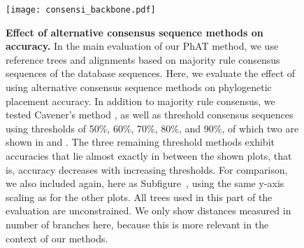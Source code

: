 \begin{figure}[hpbt]
    \centering
    \texttt{[image: consensi\_backbone.pdf]}
    \begin{subfigure}{0pt}
        \label{fig:consensi_backbone:sub:majorities}
    \end{subfigure}
    \begin{subfigure}{0pt}
        \label{fig:consensi_backbone:sub:cavener}
    \end{subfigure}
    \begin{subfigure}{0pt}
        \label{fig:consensi_backbone:sub:50_threshold}
    \end{subfigure}
    \begin{subfigure}{0pt}
        \label{fig:consensi_backbone:sub:90_threshold}
    \end{subfigure}
    \caption[Effect of alternative consensus sequence methods on accuracy]{
        \textbf{Effect of alternative consensus sequence methods on accuracy.}
        In the main evaluation of our \ac{PhAT} method,
        we use reference trees and alignments based on majority rule consensus sequences \cite{May1952,Day1992a}
        of the  database sequences.
        Here, we evaluate the effect of using alternative consensus sequence methods
        on phylogenetic placement accuracy.
        In addition to  majority rule consensus, we tested
         Cavener's method \cite{Cavener1987,Cavener1991a},
        as well as threshold consensus sequences \cite{Day1992a,Day1992}
        using thresholds of 50\%, 60\%, 70\%, 80\%, and 90\%, of which two are shown in
         and .
        The three remaining threshold methods exhibit accuracies that lie almost exactly in between the shown plots,
        that is, accuracy decreases with increasing thresholds.
        For comparison, we also included  again,
        here as Subfigure~,
        using the same y-axis scaling as for the other plots.
        All trees used in this part of the evaluation are unconstrained.
        We only show distances measured in number of branches here,
        because this is more relevant in the context of our methods.
    }
    \label{fig:consensi_backbone}
\end{figure}

